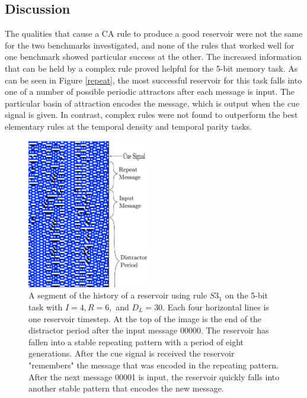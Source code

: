 \documentclass{elsarticle}
\begin{document}
\begin{multicols}{2}
	\section{Discussion}\label{discussion}
	The qualities that cause a CA rule to produce a good reservoir were not the 
        same for the two benchmarks investigated, and none of the rules that 
        worked well for one benchmark showed particular success at the other.  
        The increased information that can be held by a complex rule proved 
        helpful for the 5-bit memory task. As can be seen in Figure 
        \ref{repeat}, the most successful reservoir for this task falls into 
        one of a number of possible  periodic attractors after each message is 
        input. The particular basin of attraction encodes the message, which is 
        output when the cue signal is given. In contrast, complex rules were 
        not found to outperform the best elementary rules at the temporal 
        density and temporal parity tasks.
	
	
        \begin{figure}[H]
		\centering
                \includegraphics[width=0.475\textwidth]{RepeatMessage.pdf}
		\caption{A segment of the history of a reservoir using rule $S3_{1}$ on the 
			5-bit task with $I=4, R=6,$ and $D_{L}=30$. Each four horizontal lines is one 
			reservoir timestep. At the top of the image is the end of the distractor 
			period after the input message 00000. The reservoir has fallen into a 
			stable repeating pattern with a period of eight generations. After the 
                        cue signal is received the reservoir "remembers" the 
                        message that was encoded in the repeating pattern. 
                        After the next message 00001 is input, the reservoir 
                        quickly falls into another stable pattern that encodes 
                        the new message.} 
		

\end{figure}
\end{multicols}
\end{document}
